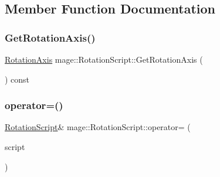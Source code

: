 \subsection{Member Function Documentation}
\hypertarget{classmage_1_1_rotation_script_a6fbbbec1bd610da2c917d1ef2d05f556}{}\label{classmage_1_1_rotation_script_a6fbbbec1bd610da2c917d1ef2d05f556} 
\subsubsection{\texorpdfstring{Get\+Rotation\+Axis()}{GetRotationAxis()}}
{\footnotesize\ttfamily \hyperlink{classmage_1_1_rotation_script_ad06cf896ce6dfe4f6676b263d15b4ee9}{Rotation\+Axis} mage\+::\+Rotation\+Script\+::\+Get\+Rotation\+Axis (\begin{DoxyParamCaption}{ }\end{DoxyParamCaption}) const\hspace{0.3cm}{\ttfamily [noexcept]}}

\hypertarget{classmage_1_1_rotation_script_a738c666a1aa42412da82d24368b20dfe}{}\label{classmage_1_1_rotation_script_a738c666a1aa42412da82d24368b20dfe} 
\subsubsection{\texorpdfstring{operator=()}{operator=()}\hspace{0.1cm}{\footnotesize\ttfamily [1/2]}}
{\footnotesize\ttfamily \hyperlink{classmage_1_1_rotation_script}{Rotation\+Script}\& mage\+::\+Rotation\+Script\+::operator= (\begin{DoxyParamCaption}\item[{const \hyperlink{classmage_1_1_rotation_script}{Rotation\+Script} \&}]{script }\end{DoxyParamCaption})\hspace{0.3cm}{\ttfamily [delete]}}

\hypertarget{classmage_1_1_rotation_script_a093aa3f50dcbbe68847bb0b5f6363e7a}{}\label{classmage_1_1_rotation_script_a093aa3f50dcbbe68847bb0b5f6363e7a} 
